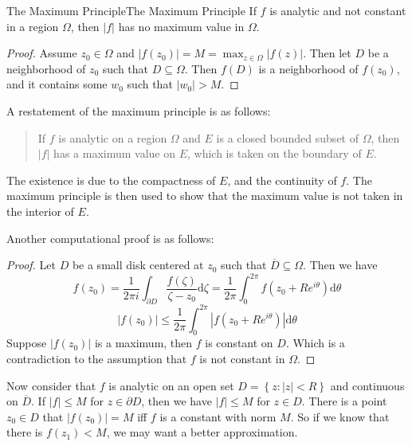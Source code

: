 \documentclass[../main.tex]{subfiles}
\begin{document}
\begin{theorem}{The Maximum Principle}{The Maximum Principle}
If $f$ is analytic and not constant in a region $\Omega$, then $\left|f\right|$ has no maximum value in $\Omega$.
\end{theorem}
\begin{proof}
	Assume $z_0\in \Omega$ and $\left|f(z_0)\right| = M = \max_{z\in \Omega} \left|f(z)\right|$. Then let $D$ be a neighborhood of $z_0$ such that $D \subseteq \Omega$. Then $f(D)$ is a neighborhood of $f(z_0)$, and it contains some $w_0$ such that $\left|w_0\right| > M$.
\end{proof}

A restatement of the maximum principle is as follows:
\begin{quote}
	If $f$ is analytic on a region $\Omega$ and $E$ is a closed bounded subset of $\Omega$, then $\left|f\right|$ has a maximum value on $E$, which is taken on the boundary of $E$.
\end{quote}
The existence is due to the compactness of $E$, and the continuity of $f$. The maximum principle is then used to show that the maximum value is not taken in the interior of $E$.

Another computational proof is as follows:
\begin{proof}
Let $D$ be a small disk centered at $z_0$ such that $\overline{D} \subseteq \Omega$. Then we have
\begin{equation*}
	f(z_0) = \frac{1}{2\pi i} \int_{\partial D} \frac{f(\zeta)}{\zeta-z_0} \mathrm{d} \zeta = \frac{1}{2\pi} \int_0^{2\pi} f(z_0 + Re^{i\theta}) \mathrm{d} \theta
\end{equation*}
\begin{equation*}
	\left|f(z_0)\right| \leq \frac{1}{2\pi} \int_0^{2\pi} \left|f(z_0 + Re^{i\theta})\right| \mathrm{d} \theta
\end{equation*}
Suppose $\left|f(z_0)\right|$ is a maximum, then $f$ is constant on $D$. Which is a contradiction to the assumption that $f$ is not constant in $\Omega$.
\end{proof}

Now consider that $f$ is analytic on an open set $D = \left\{ z: \left|z\right|<R \right\}$ and continuous on $\overline{D}$. If $\left|f\right|\leq M$ for $z\in \partial D$, then we have $\left|f\right|\leq M$ for $z\in D$. There is a point $z_0\in D$ that $\left|f(z_0)\right| = M$ iff $f$ is a constant with norm $M$. So if we know that there is $f(z_1)<M$, we may want a better approximation.
\end{document}
